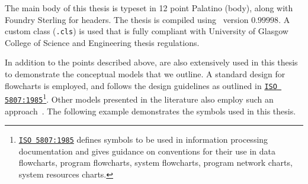 \begin{preamble}
\begin{itemize}
\end{itemize}



The main body of this thesis is typeset in 12 point Palatino (body), along with \metafont\selectfont Foundry Sterling for headers. \normalfont\selectfont The thesis is compiled using \XeTeX\ version $0.99998$. A custom class (\texttt{.cls}) is used that is fully compliant with University of Glasgow College of Science and Engineering thesis regulations.

In addition to the points described above,  are also extensively used in this thesis to demonstrate the conceptual models that we outline. A standard design for flowcharts is employed, and follows the design guidelines as outlined in \href{https://www.iso.org/standard/11955.html}{\texttt{ISO 5807:1985}}\footnote{\href{https://www.iso.org/standard/11955.html}{\texttt{ISO 5807:1985}} defines symbols to be used in information processing documentation and gives guidance on conventions for their use in data flowcharts, program flowcharts, system flowcharts, program network charts, system resources charts.}. Other models presented in the literature also employ such an approach~\citep{thomas2014modelling_behaviour}. The following example demonstrates the symbols used in this thesis.

\begin{figure}[h!]
    \centering
\end{figure}


\end{preamble}
